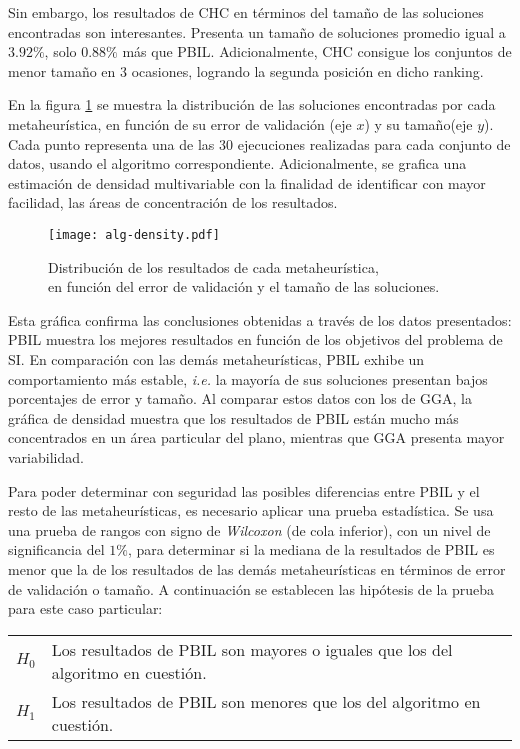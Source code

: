 Sin embargo, los resultados de CHC en términos del tamaño de las soluciones encontradas son interesantes. Presenta un tamaño de soluciones promedio igual a $3.92\%$, solo $0.88\%$ más que PBIL. Adicionalmente, CHC consigue los conjuntos de menor tamaño en 3 ocasiones, logrando la segunda posición en dicho ranking.

En la figura \ref{fig-alg-density} se muestra la distribución de las soluciones encontradas por cada metaheurística, en función de su error de validación (eje $x$) y su tamaño\linebreak(eje $y$). Cada punto representa una de las 30 ejecuciones realizadas para cada conjunto de datos, usando el algoritmo correspondiente. Adicionalmente, se grafica una estimación de densidad multivariable con la finalidad de identificar con mayor facilidad, las áreas de concentración de los resultados.

\begin{figure}[h!]
\centering
\texttt{[image: alg-density.pdf]}
\caption[Distribución de los resultados de cada metaheurística]{Distribución de los resultados de cada metaheurística,\\en función del error de validación y el tamaño de las soluciones.}
\label{fig-alg-density}
\end{figure}

Esta gráfica confirma las conclusiones obtenidas a través de los datos presentados: PBIL muestra los mejores resultados en función de los objetivos del problema de SI. En comparación con las demás metaheurísticas, PBIL exhibe un comportamiento más estable, \emph{i.e.} la mayoría de sus soluciones presentan bajos porcentajes de error y tamaño. Al comparar estos datos con los de GGA, la gráfica de densidad muestra que los resultados de PBIL están mucho más concentrados en un área particular del plano, mientras que GGA presenta mayor variabilidad.

Para poder determinar con seguridad las posibles diferencias entre PBIL y el resto de las metaheurísticas, es necesario aplicar una prueba estadística. Se usa una prueba de rangos con signo de \emph{Wilcoxon} \cite{wilcoxon1945individual} (de cola inferior), con un nivel de significancia del $1\%$, para determinar si la mediana de la resultados de PBIL es menor que la de los resultados de las demás metaheurísticas en términos de error de validación o tamaño. A continuación se establecen las hipótesis de la prueba para este caso particular:

\begin{tabular}{l l}
$H_0$ & Los resultados de PBIL son mayores o iguales que los del algoritmo en cuestión.\\
$H_1$ & Los resultados de PBIL son menores que los del algoritmo en cuestión.\\
\end{tabular}

